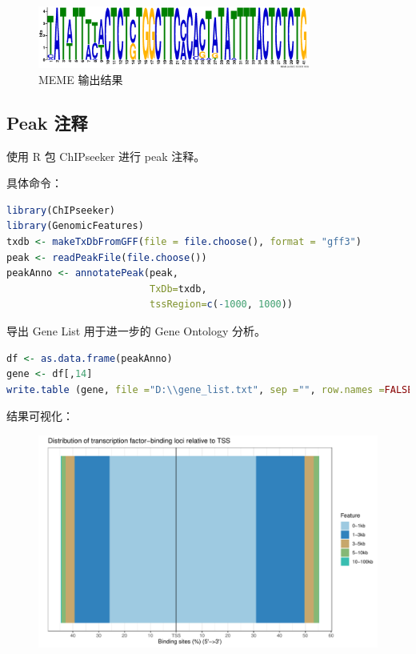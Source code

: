 \documentclass[UTF8]{ctexart}
\begin{document}
\begin{figure}
	\centering
	\includegraphics[width=0.8\textwidth]{img/meme_out/logo3.eps}
	\caption{MEME 输出结果}
\end{figure}

\clearpage

\subsection{Peak 注释}

使用 R 包 ChIPseeker 进行 peak 注释。

具体命令：

\begin{lstlisting}[language=R]
library(ChIPseeker)
library(GenomicFeatures)
txdb <- makeTxDbFromGFF(file = file.choose(), format = "gff3")
peak <- readPeakFile(file.choose())
peakAnno <- annotatePeak(peak,
                         TxDb=txdb,
                         tssRegion=c(-1000, 1000))
\end{lstlisting}

导出 Gene List 用于进一步的 Gene Ontology 分析。

\begin{lstlisting}[language=R]
df <- as.data.frame(peakAnno)
gene <- df[,14]
write.table (gene, file ="D:\\gene_list.txt", sep ="", row.names =FALSE, col.names =FALSE, quote =FALSE)
\end{lstlisting}

结果可视化：

\begin{figure}[htb]
	\centering
	\includegraphics[width=\textwidth]{img/peak_distrubution.pdf}
\end{figure}
\end{document}
